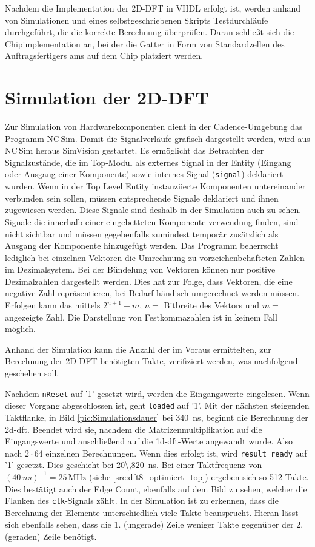 Nachdem die Implementation der 2D-DFT in VHDL erfolgt ist, werden anhand von Simulationen und eines selbstgeschriebenen Skripts Testdurchläufe durchgeführt, die die
korrekte Berechnung überprüfen.
Daran schließt sich die Chipimplementation an, bei der die Gatter in Form von Standardzellen des Auftragsfertigers \gls{ams} auf dem Chip platziert werden.

\section{Simulation der 2D-DFT}
Zur Simulation von Hardwarekomponenten dient in der Cadence-Umgebung das Programm NC\,Sim. Damit die Signalverläufe grafisch dargestellt werden, wird aus NC\,Sim 
heraus SimVision gestartet.
Es ermöglicht das Betrachten der Signalzustände, die im Top-Modul als externes Signal in der Entity (Eingang oder Ausgang einer Komponente) sowie internes Signal 
(\texttt{signal}) deklariert wurden. Wenn in der Top Level Entity instanziierte Komponenten untereinander verbunden sein sollen, müssen entsprechende Signale 
deklariert und ihnen zugewiesen werden. Diese Signale sind deshalb in der Simulation auch zu sehen. Signale die innerhalb einer eingebetteten Komponente verwendung finden, sind 
nicht sichtbar und müssen gegebenfalls zumindest temporär zusätzlich als Ausgang der Komponente hinzugefügt werden.
Das Programm beherrscht lediglich bei einzelnen Vektoren die Umrechnung zu vorzeichenbehafteten Zahlen im Dezimalsystem.
Bei der Bündelung von Vektoren können nur positive Dezimalzahlen dargestellt werden. Dies hat zur Folge, dass Vektoren, die eine negative Zahl repräsentieren, 
bei Bedarf händisch umgerechnet werden müssen. 
Erfolgen kann das mittels $2^{n+1}+m$, $n=$ Bitbreite des Vektors und $m=$ angezeigte Zahl. Die Darstellung von Festkommazahlen ist in keinem Fall möglich.

 Anhand der Simulation kann die Anzahl der im Voraus ermittelten, zur Berechnung der 2D-DFT benötigten Takte, verifiziert werden, was nachfolgend geschehen soll.
 
 Nachdem \texttt{nReset} auf '1' gesetzt wird, werden die Eingangswerte
 eingelesen. Wenn dieser Vorgang abgeschlossen ist, geht \texttt{loaded} auf '1'. Mit der nächsten steigenden Taktflanke, in Bild \ref{pic:Simulationsdauer} bei 
 \SI{340}{ns}, beginnt die Berechnung
 der \gls{2d-dft}. Beendet wird sie, nachdem die Matrizenmultiplikation auf die Eingangswerte und anschließend auf die \gls{1d-dft}-Werte angewandt wurde. Also nach $2 \cdot 64$
 einzelnen Berechnungen. Wenn dies erfolgt ist, wird \texttt{result\_ready} auf '1' gesetzt. Dies geschieht bei \SI{20\,820}{ns}. Bei einer Taktfrequenz von $(\SI{40}{ns})^{-1}=25\,\textrm{MHz}$
 (siehe \ref{src:dft8_optimiert_top}) ergeben sich so 512 Takte. Dies bestätigt auch der Edge Count, ebenfalls auf dem Bild zu sehen, welcher die Flanken des \texttt{clk}-Signals 
 zählt. In der Simulation ist zu erkennen, dass die Berechnung der Elemente 
 unterschiedlich viele Takte beansprucht. Hieran lässt sich ebenfalls sehen, dass die 1. (ungerade) Zeile weniger Takte gegenüber der 2. (geraden) Zeile benötigt. 
 
